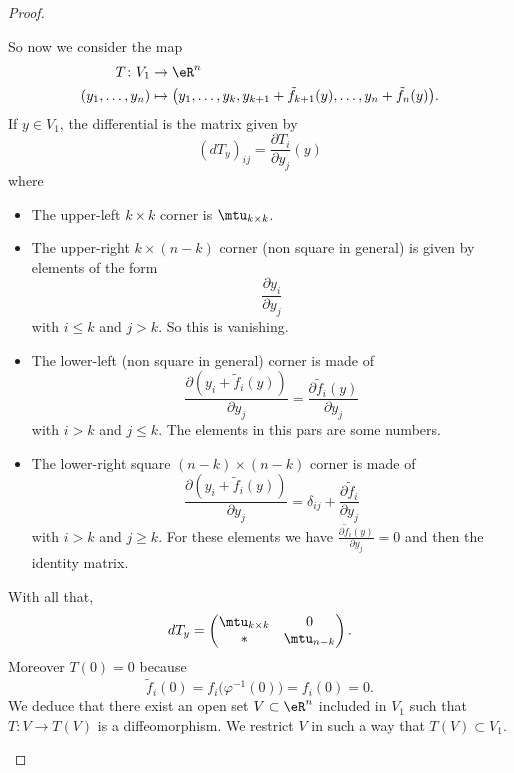 \begin{proof}
\begin{subproof}
\begin{subproof}
			So now we consider the map
			\begin{equation}        \label{EQooKEZOooSOTBlo}
				\begin{aligned}
					T\colon V_1       & \to \eR^n                                                                                \\
					(y_1,\ldots, y_n) & \mapsto \big( y_1,\ldots, y_k,y_{k+1}+\tilde f_{k+1}(y),\ldots, y_n+\tilde f_n(y) \big).
				\end{aligned}
			\end{equation}
			If \( y\in V_1\), the differential is the matrix given by
			\begin{equation}
				(dT_y)_{ij}=\frac{ \partial T_i }{ \partial y_j }(y)
			\end{equation}
			where
			\begin{itemize}
				\item
				      The upper-left \( k\times k\) corner is \( \mtu_{k\times k}\).
				\item
				      The upper-right \( k\times (n-k)\) corner (non square in general) is given by elements of the form
				      \begin{equation}
					      \frac{ \partial y_i }{ \partial y_{j} }
				      \end{equation}
				      with \( i\leq k\) and \( j>k\). So this is vanishing.
				\item
				      The lower-left (non square in general) corner is made of
				      \begin{equation}
					      \frac{ \partial (y_i+\tilde f_i(y)) }{ \partial y_j }=\frac{ \partial \tilde f_i(y) }{ \partial y_j }
				      \end{equation}
				      with \( i>k\) and \( j\leq k\). The elements in this pars are some numbers.
				\item
				      The lower-right square \( (n-k)\times (n-k)\) corner is made of
				      \begin{equation}
					      \frac{ \partial (y_i+\tilde f_i(y)) }{ \partial y_j }=\delta_{ij}+\frac{ \partial \tilde f_i }{ \partial y_j }
				      \end{equation}
				      with \( i>k\) and \( j\geq k\). For these elements we have \( \frac{ \partial \tilde f_i(y) }{ \partial y_j }=0\) and then the identity matrix.
			\end{itemize}
			With all that,
			\begin{equation}
				dT_y=\begin{pmatrix}
					\mtu_{k\times k} & 0          \\
					*                & \mtu_{n-k}
				\end{pmatrix}.
			\end{equation}
			Moreover \( T(0)=0\) because
			\begin{equation}
				\tilde f_i(0)=f_i\big( \varphi^{-1}(0) \big)=f_i(0)=0.
			\end{equation}
			We deduce that there exist an open set \( V\subset \eR^n\) included in \( V_1\) such that \( T\colon V\to T(V)\) is a diffeomorphism. We restrict \( V\) in such a way that \( T(V)\subset V_1\).


\end{subproof}
\end{subproof}
\end{proof}
